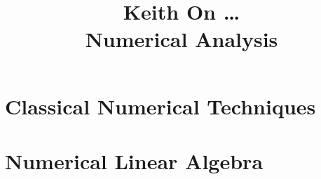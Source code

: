 \documentclass[openany]{book}
\title{
  {\Huge
  Keith On \ldots \\
  \huge
  Numerical Analysis
  \normalsize}
}
\author{
  
}
\date{}
\begin{document}
\normalbaselineskip

\maketitle
\tableofcontents
\listoffigures
\listoftables
\newpage



\part{Classical Numerical Techniques}












\part{Numerical Linear Algebra}




\appendix




\end{document}
